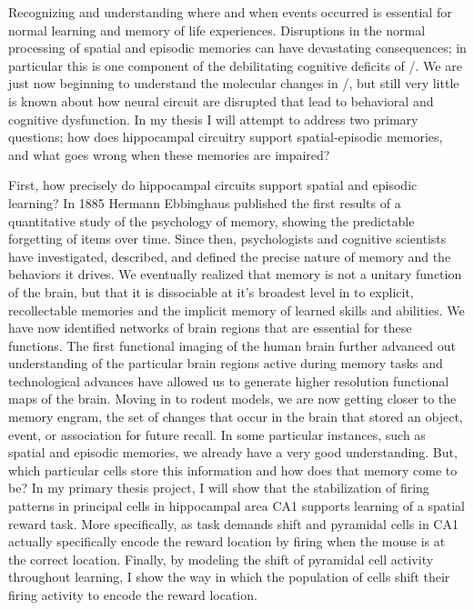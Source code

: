 \acresetall
Recognizing and understanding where and when events occurred is essential for normal learning and memory of life experiences.
Disruptions in the normal processing of spatial and episodic memories can have devastating consequences; in particular this is one component of the debilitating cognitive deficits of \scz/.
We are just now beginning to understand the molecular changes in \scz/, but still very little is known about how neural circuit are disrupted that lead to behavioral and cognitive dysfunction.
In my thesis I will attempt to address two primary questions; how does hippocampal circuitry support spatial-episodic memories, and what goes wrong when these memories are impaired?

First, how precisely do hippocampal circuits support spatial and episodic learning?
In 1885 Hermann Ebbinghaus published the first results of a quantitative study of the psychology of memory, showing the predictable forgetting of items over time.
Since then, psychologists and cognitive scientists have investigated, described, and defined the precise nature of memory and the behaviors it drives.
We eventually realized that memory is not a unitary function of the brain, but that it is dissociable at it's broadest level in to explicit, recollectable memories and the implicit memory of learned skills and abilities.
We have now identified networks of brain regions that are essential for these functions.
The first functional imaging of the human brain further advanced out understanding of the particular brain regions active during memory tasks and technological advances have allowed us to generate higher resolution functional maps of the brain.
Moving in to rodent models, we are now getting closer to the memory engram, the set of changes that occur in the brain that stored an object, event, or association for future recall.
In some particular instances, such as spatial and episodic memories, we already have a very good understanding. But, which particular cells store this information and how does that memory come to be?
In my primary thesis project, I will show that the stabilization of firing patterns in principal cells in hippocampal area CA1 supports learning of a spatial reward task.
More specifically, as task demands shift and pyramidal cells in CA1 actually specifically encode the reward location by firing when the mouse is at the correct location.
Finally, by modeling the shift of pyramidal cell activity throughout learning, I show the way in which the population of cells shift their firing activity to encode the reward location.

